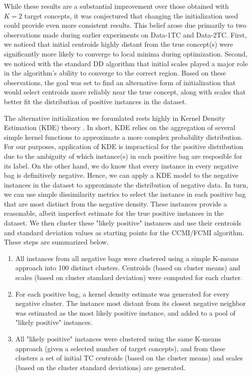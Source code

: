 \documentclass[12pt,dvips]{report}
\numberwithin{equation}{section}
\begin{document}
While these results are a substantial improvement over those obtained with $K=2$ target concepts, it was conjectured that changing the initialization used could provide even more consistent results.  This belief arose due primarily to two observations made during earlier experiments on Data-1TC and Data-2TC.  First, we noticed that initial centroids highly distant from the true concept(s) were significantly more likely to converge to local minima during optimization.  Second, we noticed with the standard DD algorithm that initial scales played a major role in the algorithm's ability to converge to the correct region.  Based on these observations, the goal was set to find an alternative form of initialization that would select centroids more reliably near the true concept, along with scales that better fit the distribution of positive instances in the dataset.

The alternative initialization we forumlated rests highly in Kernel Density Estimation (KDE) theory \cite{silverman2018density}.  In short, KDE relies on the aggregation of several simple kernel functions to approximate a more complex probability distribution.  For our purposes, application of KDE is impractical for the positive distribution due to the ambiguity of which instance(s) in each positive bag are resposible for its label.  On the other hand, we do know that every instance in every negative bag is definitively negative.  Hence, we can apply a KDE model to the negative instances in the dataset to approximate the distribution of negative data.  In turn, we can use simple dissimilarity metrics to select the instance in each positive bag that are most distinct from the negative density.  These instances provide a reasonable, albeit imperfect estimate for the true positive instances in the dataset.  We then cluster these "likely positive" instances and use their centroids and standard deviation values as starting points for the CCMI/FCMI algorithm.  These steps are summarized below.  

\begin{enumerate}
  \item All instances from all negative bags were clustered using a simple K-means approach into 100 distinct clusters.  Centroids (based on cluster means) and scales (based on cluster standard deviation) were computed for each cluster.
  \item For each positive bag, a kernel density estimate was generated for every negative cluster.  The instance most distant from its closest negative neighbor was estimated as the most likely positive instance, and added to a pool of "likely positive" instances.
  \item All "likely positive" instances were clustered using the same K-means approach (given a selected number of target concepts), and from these clusters a set of initial TC centroids (based on the cluster means) and scales (based on the cluster standard deviations) are generated.
\end{enumerate}  
\end{document}

